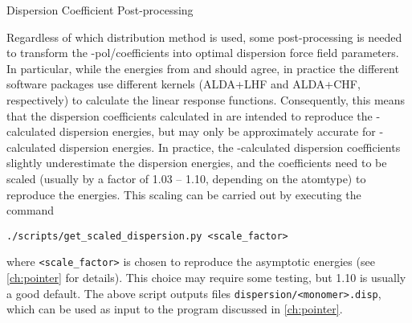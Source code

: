 \begin{subsubsection}{Dispersion Coefficient Post-processing}
\label{sec:workflow-cn_postprocess}

Regardless of which distribution method is used, some post-processing is
needed to transform the \isa-pol/\idma coefficients into optimal dispersion
force field parameters. In particular, while the \dftsapt energies from
\molpro and \camcasp should agree, in practice the different software packages
use different kernels (ALDA+LHF and ALDA+CHF, respectively) to calculate the
linear response functions. Consequently, this means that the dispersion
coefficients calculated in \camcasp are intended to reproduce the \camcasp-calculated
\dftsapt dispersion energies, but may only be approximately accurate for
\molpro-calculated \dftsapt dispersion energies.\footnotemark{ } In practice, the
\camcasp-calculated dispersion coefficients slightly underestimate the \molpro
dispersion energies, and the coefficients need to be scaled (usually by a
factor of 1.03 -- 1.10,
depending on the atomtype) to reproduce the \molpro energies. This scaling can
be carried out by executing the command
%
\begin{lstlisting}
./scripts/get_scaled_dispersion.py <scale_factor>
\end{lstlisting}
%
where \verb|<scale_factor>| is chosen to reproduce the asymptotic \molpro
\dftsapt energies (see \cref{ch:pointer} for details). This choice may require some
testing, but 1.10 is usually a good default. The above script outputs files
\verb|dispersion/<monomer>.disp|, which can be used as input to the \pointer
program discussed in \cref{ch:pointer}.


\end{subsubsection}
